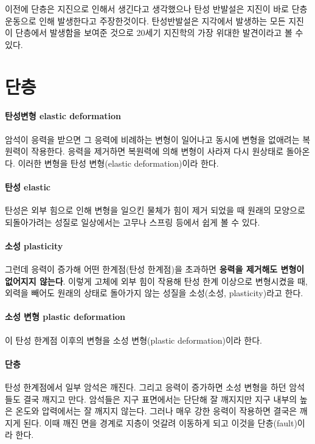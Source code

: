 \documentclass[12pt, a4paper, oneside]{book}
\begin{document}
		이전에 단층은 지진으로 인해서 생긴다고 생각했으나 
		탄성 반발설은 지진이 바로 단층 운동으로 인해 발생한다고 주장한것이다.
		탄성반발설은 지각에서 발생하는 모든 지진이 단층에서 발생함을  보여준 것으로 
		20세기 지진학의 가장 위대한 발견이라고 볼 수 있다.
		
				
		
	\clearpage
	\section{단층}

		\paragraph{탄성변형 elastic deformation}
		암석이 응력을 받으면 그 응력에 비례하는 변형이 일어나고 동시에 변형을 없애려는 복원력이 작용한다.
		응력을 제거하면 복원력에 의해 변형이 사라져 다시 원상태로 돌아온다.
		이러한 변형을 탄성 변형(elastic deformation)이라 한다.
		
		\paragraph{탄성 elastic}
		탄성은 외부 힘으로 인해 변형을 일으킨 물체가 힘이 제거 되었을 때 원래의 모양으로 되돌아가려는 성질로 
		일상에서는 고무나 스프링 등에서 쉽게 볼 수 있다. 
		
		\paragraph{소성 plasticity}
		그런데 응력이 증가해 어떤 한계점(탄성 한계점)을 초과하면 \textbf{응력을 제거해도 변형이 없어지지 않는다}.
		이렇게 고체에 외부 힘이 작용해 탄성 한계 이상으로 변형시켰을 때, 
		외력을 빼어도 원래의 상태로 돌아가지 않는 성질을 소성(소성, plasticity)라고 한다. 
		
		\paragraph{소성 변형 plastic deformation}
		이 탄성 한계점 이후의 변형을 소성 변형(plastic deformation)이라 한다.
	
		\paragraph{단층}
		탄성 한계점에서 일부 암석은 깨진다.
		그리고 응력이 증가하면 소성 변형을 하던 암석들도 결국 깨지고 만다. 
		암석들은 지구 표면에서는 단단해 잘 깨지지만 지구 내부의 높은 온도와 압력에서는 잘 깨지지 않는다.
		그러나 매우 강한 응력이 작용하면 결국은  깨지게 된다.
		이때 깨진 면을 경계로 지층이 엇갈려 이동하게 되고 이것을 단층(fault)이라 한다. 
	
\end{document}
